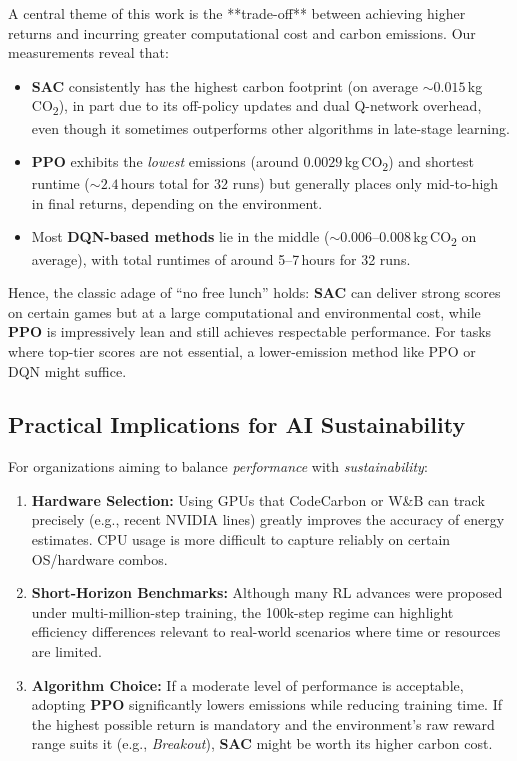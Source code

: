 A central theme of this work is the **trade-off** between achieving higher returns 
and incurring greater computational cost and carbon emissions. Our measurements reveal that:
\begin{itemize}
	\item \textbf{SAC} consistently has the highest carbon footprint (on average $\sim 0.015$\,kg\,CO\textsubscript{2}), 
	in part due to its off-policy updates and dual Q-network overhead, 
	even though it sometimes outperforms other algorithms in late-stage learning.
	\item \textbf{PPO} exhibits the \emph{lowest} emissions (around $0.0029$\,kg\,CO\textsubscript{2}) 
	and shortest runtime ($\sim2.4$\,hours total for 32 runs) but generally places 
	only mid-to-high in final returns, depending on the environment.
	\item Most \textbf{DQN-based methods} lie in the middle 
	($\sim0.006$--$0.008$\,kg\,CO\textsubscript{2} on average), 
	with total runtimes of around 5--7\,hours for 32 runs.
\end{itemize}

Hence, the classic adage of “no free lunch” holds: \textbf{SAC} can deliver strong scores 
on certain games but at a large computational and environmental cost, 
while \textbf{PPO} is impressively lean and still achieves respectable performance. 
For tasks where top-tier scores are not essential, 
a lower-emission method like PPO or DQN might suffice.

\subsection{Practical Implications for AI Sustainability}
\label{subsec:practical_sustainability}

For organizations aiming to balance \emph{performance} with \emph{sustainability}:
\begin{enumerate}
	\item \textbf{Hardware Selection:} 
	Using GPUs that CodeCarbon or W\&B can track precisely (e.g., recent NVIDIA lines) 
	greatly improves the accuracy of energy estimates. CPU usage is more difficult 
	to capture reliably on certain OS/hardware combos.
	\item \textbf{Short-Horizon Benchmarks:} 
	Although many RL advances were proposed under multi-million-step training, 
	the 100k-step regime can highlight efficiency differences relevant to 
	real-world scenarios where time or resources are limited.
	\item \textbf{Algorithm Choice:} 
	If a moderate level of performance is acceptable, adopting \textbf{PPO} 
	significantly lowers emissions while reducing training time. 
	If the highest possible return is mandatory and the environment's raw reward range 
	suits it (e.g., \emph{Breakout}), \textbf{SAC} might be worth its higher carbon cost.
\end{enumerate}

